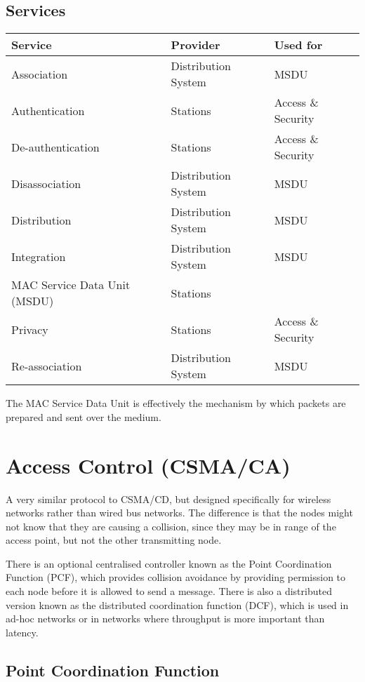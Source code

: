 \subsection*{Services}

\begin{table}
  \centering
  \begin{tabular}[H]{ lll }
    \hline Service & Provider & Used for\\
    \hline Association & Distribution System & MSDU\\
    Authentication & Stations & Access \& Security\\
    De-authentication &  Stations & Access \& Security\\
    Disassociation & Distribution System & MSDU\\
    Distribution & Distribution System & MSDU\\
    Integration & Distribution System & MSDU\\
    MAC Service Data Unit (MSDU) & Stations & \\
    Privacy & Stations & Access \& Security\\
    Re-association & Distribution System & MSDU\\
    \hline
  \end{tabular}
\end{table}

The MAC Service Data Unit is effectively the mechanism by which packets are prepared and sent over the medium.

\section*{Access Control (CSMA/CA)}

A very similar protocol to CSMA/CD, but designed specifically for wireless networks rather than wired bus networks.
 The difference is that the nodes might not know that they are causing a collision, since they may be in range of the
 access point, but not the other transmitting node.

There is an optional centralised controller known as the Point Coordination Function (PCF), which provides collision
 avoidance by providing permission to each node before it is allowed to send a message. There is also a distributed
 version known as the distributed coordination function (DCF), which is used in ad-hoc networks or in networks where
 throughput is more important than latency.

\subsection*{Point Coordination Function}

